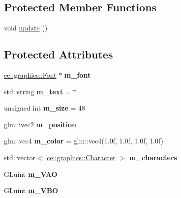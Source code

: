 \subsection*{Protected Member Functions}
\begin{DoxyCompactItemize}
\item 
void \hyperlink{classce_1_1graphics_1_1_text_a666aae08c7a6c6344b0722ffbefd6fb3}{update} ()
\end{DoxyCompactItemize}
\subsection*{Protected Attributes}
\begin{DoxyCompactItemize}
\item 
\mbox{\label{classce_1_1graphics_1_1_text_ac24aa6948fcd48f365e8327dc0b0db73}} 
\hyperlink{classce_1_1graphics_1_1_font}{ce\+::graphics\+::\+Font} $\ast$ {\bfseries m\+\_\+font}
\item 
\mbox{\label{classce_1_1graphics_1_1_text_a172659977452467ed56f00182ba67c13}} 
std\+::string {\bfseries m\+\_\+text} = \char`\"{}\char`\"{}
\item 
\mbox{\label{classce_1_1graphics_1_1_text_a4f11e340917dbd28cb664a96d8d63ae5}} 
unsigned int {\bfseries m\+\_\+size} = 48
\item 
\mbox{\label{classce_1_1graphics_1_1_text_a6a154160a60e196464a2371df2a5cf72}} 
glm\+::ivec2 {\bfseries m\+\_\+position}
\item 
\mbox{\label{classce_1_1graphics_1_1_text_ae23869942fc68b6e59131574fb0aa7a7}} 
glm\+::vec4 {\bfseries m\+\_\+color} = glm\+::vec4(1.\+0f, 1.\+0f, 1.\+0f, 1.\+0f)
\item 
\mbox{\label{classce_1_1graphics_1_1_text_a3290f89985cc8b4f74051235f281d157}} 
std\+::vector$<$ \hyperlink{structce_1_1graphics_1_1_character}{ce\+::graphics\+::\+Character} $>$ {\bfseries m\+\_\+characters}
\item 
\mbox{\label{classce_1_1graphics_1_1_text_a152e95edbed3733f77d6036985e918f6}} 
G\+Luint {\bfseries m\+\_\+\+V\+AO}
\item 
\mbox{\label{classce_1_1graphics_1_1_text_a7e5a825933c15cf45ce80de33eb941b7}} 
G\+Luint {\bfseries m\+\_\+\+V\+BO}
\end{DoxyCompactItemize}


